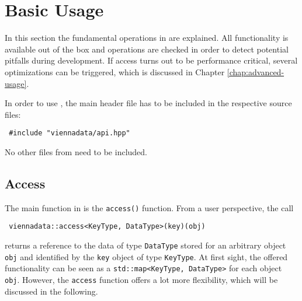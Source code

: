 \chapter{Basic Usage} \label{chap:basic-usage}



In this section the fundamental operations in {\ViennaData} are explained.
All functionality is available out of the box and operations are checked in order to detect potential pitfalls during development.
If {\ViennaData} access turns out to be
performance critical, several optimizations can be triggered, which is discussed in Chapter \ref{chap:advanced-usage}.

In order to use {\ViennaData}, the main header file has to be included in the respective source files:
\begin{lstlisting}
 #include "viennadata/api.hpp"
\end{lstlisting}
No other files from {\ViennaData} need to be included.

\section{Access} \label{sec:access}
The main function in {\ViennaData} is the \lstinline|access()| function. From a user perspective,
the call
\begin{lstlisting}
 viennadata::access<KeyType, DataType>(key)(obj)
\end{lstlisting}
returns a reference to the data of type \lstinline|DataType| stored for an arbitrary object \lstinline|obj| and identified by the \lstinline|key| object of
type \lstinline|KeyType|. At first sight, the offered functionality can be seen as a \lstinline|std::map<KeyType, DataType>| for each object \lstinline|obj|.
However, the \lstinline|access| function offers a lot more flexibility, which will be discussed in the following.

